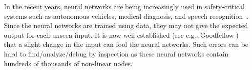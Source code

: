 









In the recent years, neural networks are being increasingly used in safety-critical systems such as autonomous vehicles, medical diagnosis, and speech recognition~\cite{bojarski2016end,amato2013artificial,hinton2012deep}. Since the neural networks are trained using data, they may not give the expected output for each unseen input. It is now well-established (see e.g., Goodfellow \cite{goodfellow2014explaining}) that a slight change in the input can fool the neural networks. Such errors can be hard to find/analyze/debug by inspection as these neural networks contain hundreds of thousands of non-linear nodes.

